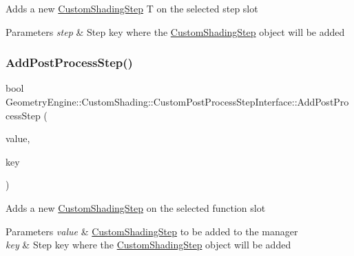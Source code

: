 Adds a new \mbox{\hyperlink{class_geometry_engine_1_1_custom_shading_1_1_custom_shading_step}{Custom\+Shading\+Step}} T on the selected step slot 
\begin{DoxyParams}{Parameters}
{\em step} & Step key where the \mbox{\hyperlink{class_geometry_engine_1_1_custom_shading_1_1_custom_shading_step}{Custom\+Shading\+Step}} object will be added \\
\hline
\end{DoxyParams}
\mbox{\label{class_geometry_engine_1_1_custom_shading_1_1_custom_post_process_step_interface_a9505d08bc1653e9c08cdb5a06b75ffa3}} 
\subsubsection{\texorpdfstring{AddPostProcessStep()}{AddPostProcessStep()}}
{\footnotesize\ttfamily bool Geometry\+Engine\+::\+Custom\+Shading\+::\+Custom\+Post\+Process\+Step\+Interface\+::\+Add\+Post\+Process\+Step (\begin{DoxyParamCaption}\item[{\mbox{\hyperlink{class_geometry_engine_1_1_custom_shading_1_1_custom_post_process_step}{Custom\+Post\+Process\+Step}} $\ast$}]{value,  }\item[{\mbox{\hyperlink{namespace_geometry_engine_1_1_custom_shading_a09e44ca81de5fe08c6d50271d680c4b1}{Custom\+Post\+Process\+Steps}}}]{key }\end{DoxyParamCaption})}

Adds a new \mbox{\hyperlink{class_geometry_engine_1_1_custom_shading_1_1_custom_shading_step}{Custom\+Shading\+Step}} on the selected function slot 
\begin{DoxyParams}{Parameters}
{\em value} & \mbox{\hyperlink{class_geometry_engine_1_1_custom_shading_1_1_custom_shading_step}{Custom\+Shading\+Step}} to be added to the manager \\
\hline
{\em key} & Step key where the \mbox{\hyperlink{class_geometry_engine_1_1_custom_shading_1_1_custom_shading_step}{Custom\+Shading\+Step}} object will be added \\
\hline
\end{DoxyParams}
\mbox{\label{class_geometry_engine_1_1_custom_shading_1_1_custom_post_process_step_interface_a6cf76b4b01230046a84cedcac73c089e}} 
